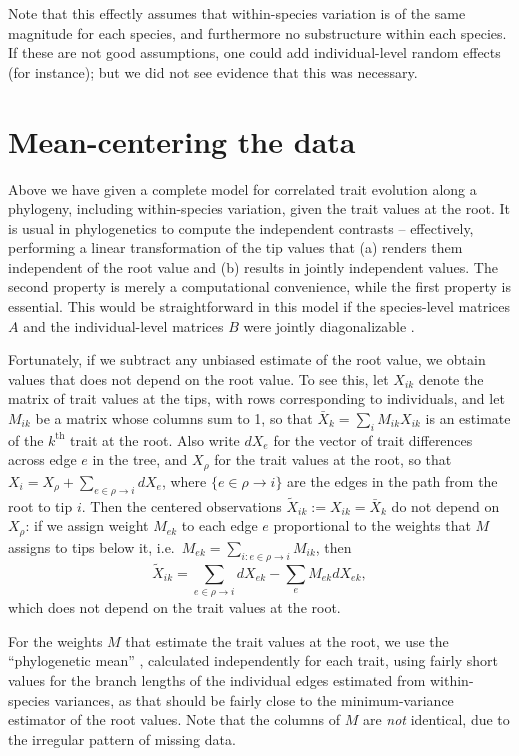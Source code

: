 \documentclass{article}
\begin{document}
Note that this effectly assumes that within-species variation is of the same magnitude for each species,
and furthermore no substructure within each species.
If these are not good assumptions, one could add individual-level random effects (for instance);
but we did not see evidence that this was necessary.


\section{Mean-centering the data}

Above we have given a complete model for correlated trait evolution along a phylogeny,
including within-species variation,
given the trait values at the root.
It is usual in phylogenetics to compute the independent contrasts -- 
effectively, performing a linear transformation of the tip values that (a) renders them independent of the root value
and (b) results in jointly independent values.
The second property is merely a computational convenience, while the first property is essential.
This would be straightforward in this model if the species-level matrices $A$ and the individual-level matrices $B$ were jointly diagonalizable 
\citep[as in][]{revell2009phylogenetic}.

Fortunately, if we subtract any unbiased estimate of the root value, we obtain values that does not depend on the root value.
To see this, let $X_{ik}$ denote the matrix of trait values at the tips, with rows corresponding to individuals, 
and let $M_{ik}$ be a matrix whose columns sum to 1, so that 
$\bar X_k = \sum_i M_{ik} X_{ik}$ is an estimate of the $k^\mathrm{th}$ trait at the root.
Also write $dX_e$ for the vector of trait differences across edge $e$ in the tree,
and $X_\rho$ for the trait values at the root,
so that $X_i = X_\rho + \sum_{e \in \rho \to i} dX_e$,
where $\{e \in \rho \to i\}$ are the edges in the path from the root to tip $i$.
Then the centered observations $\widetilde X_{ik} := X_{ik} = \bar X_k$ do not depend on $X_\rho$:
if we assign weight $M_{ek}$ to each edge $e$ proportional to the weights that $M$ assigns to tips below it,
i.e.\ $M_{ek} = \sum_{i : e \in \rho \to i} M_{ik}$, then
\begin{equation} \label{eqn:mean_centering}
  \widetilde X_{ik} = \sum_{e \in \rho \to i} dX_{ek} - \sum_e M_{ek} dX_{ek} ,
\end{equation}
which does not depend on the trait values at the root.

For the weights $M$ that estimate the trait values at the root,
we use the ``phylogenetic mean'' \citep{felsenstein1973maximumlikelihood},
calculated independently for each trait,
using fairly short values for the branch lengths of the individual edges estimated from within-species variances,
as that should be fairly close to the minimum-variance estimator of the root values.
Note that the columns of $M$ are \emph{not} identical,
due to the irregular pattern of missing data.
\end{document}
